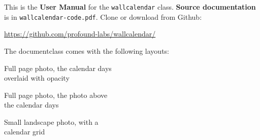 \bigskip

\thispagestyle{empty}

This is the \textbf{User Manual} for the \texttt{wallcalendar} class.
\textbf{Source documentation} is in \texttt{wallcalendar-code.pdf}. Clone or
download from Github:

\href{https://github.com/profound-labs/wallcalendar/}{https://github.com/profound-labs/wallcalendar/}

The documentclass comes with the following layouts:

\bigskip

\makeatletter
\newlength\exampleWidth
\setlength{\exampleWidth}{45mm}
\makeatother

\begin{extrafullwidth}

\hfill
\begin{minipage}{0.31\linewidth}
\centering

Full page photo, the calendar days\\
overlaid with opacity

\bigskip


\end{minipage}%
\begin{minipage}{0.31\linewidth}
\centering

Full page photo, the photo above\\
the calendar days

\bigskip


\end{minipage}%
\begin{minipage}{0.31\linewidth}
\centering

Small landscape photo, with a\\
calendar grid

\bigskip


\end{minipage}
\hfill\mbox{}

\end{extrafullwidth}

\bigskip


